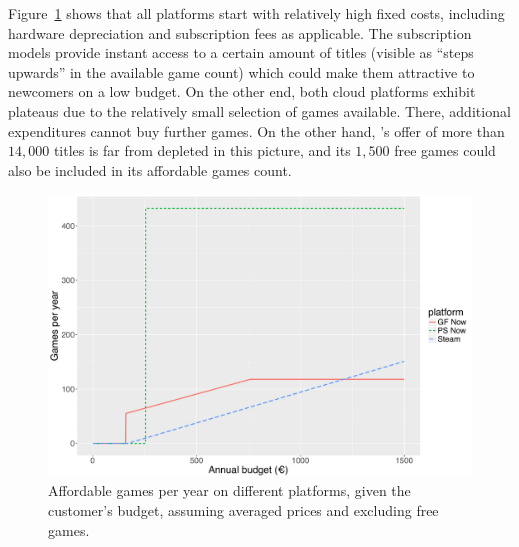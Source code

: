 Figure~\ref{fig:gamesperyear-over-budget} shows that
all platforms start with relatively high fixed costs, including hardware
depreciation and subscription fees as applicable. The subscription
models provide instant access to a certain amount of titles (visible as
``steps upwards'' in the available game count) which could make them
attractive to newcomers on a low budget. On the other end, both cloud
platforms exhibit plateaus due to the relatively small selection of
games available. There, additional expenditures cannot buy further
games. On the other hand, \steam's offer of more than $14,000$
titles is far from depleted in this picture, and its $1,500$ free
games could also be included in its affordable games count.


\begin{figure}[!t]
	\centering
	\includegraphics[width=1.0\columnwidth]{images/gamesperyear-over-budget.pdf}
	\caption{Affordable games per year on different platforms, given the customer's budget, assuming averaged prices and excluding free \steam games.}
\label{fig:gamesperyear-over-budget}
\end{figure}


